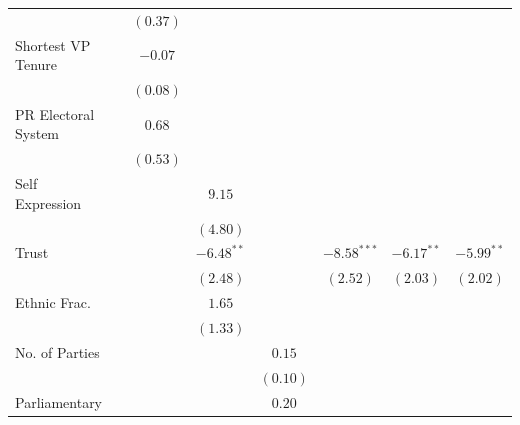 \documentclass[a4paper]{article}\usepackage{graphicx, color}
\begin{document}
\begin{table}
\begin{center}
\begin{tabular}{l c c c c c c c }
                         &               & $(0.37)$     &              &               &               &                    &                   \\
Shortest VP Tenure       &               & $-0.07$      &              &               &               &                    &                   \\
                         &               & $(0.08)$     &              &               &               &                    &                   \\
PR Electoral System      &               & $0.68$       &              &               &               &                    &                   \\
                         &               & $(0.53)$     &              &               &               &                    &                   \\
Self Expression          &               &              & $9.15$       &               &               &                    &                   \\
                         &               &              & $(4.80)$     &               &               &                    &                   \\
Trust                    &               &              & $-6.48^{**}$ &               & $-8.58^{***}$ & $-6.17^{**}$       & $-5.99^{**}$      \\
                         &               &              & $(2.48)$     &               & $(2.52)$      & $(2.03)$           & $(2.02)$          \\
Ethnic Frac.             &               &              & $1.65$       &               &               &                    &                   \\
                         &               &              & $(1.33)$     &               &               &                    &                   \\
No. of Parties           &               &              &              & $0.15$        &               &                    &                   \\
                         &               &              &              & $(0.10)$      &               &                    &                   \\
Parliamentary            &               &              &              & $0.20$        &               &                    &                   \\

\end{tabular}
\end{center}
\end{table}
\end{document}
